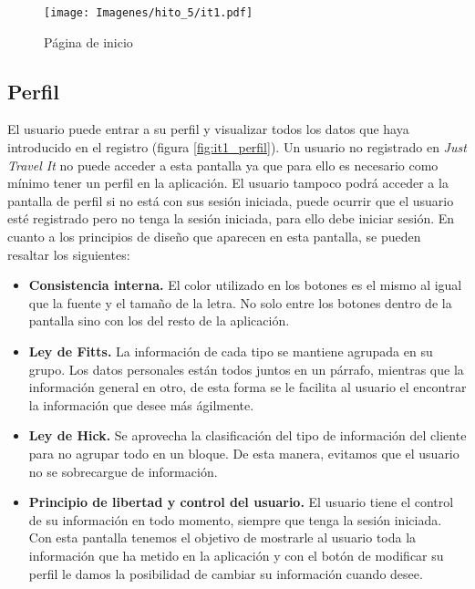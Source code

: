\begin{figure}[H]
    \centering
    \texttt{[image: Imagenes/hito\_5/it1.pdf]}
    \caption{Página de inicio}
    \label{fig:it1_registro}
\end{figure}

\subsection*{Perfil}

El usuario puede entrar a su perfil y visualizar todos los datos que haya introducido en el
registro (figura \ref{fig:it1_perfil}). Un usuario no registrado en \textit{Just Travel It} no puede acceder a esta pantalla ya que
para ello es necesario como mínimo tener un perfil en la aplicación. El usuario tampoco podrá
acceder a la pantalla de perfil si no está con sus sesión iniciada, puede ocurrir que el usuario
esté registrado pero no tenga la sesión iniciada, para ello debe iniciar sesión. En cuanto a los
principios de diseño que aparecen en esta pantalla, se pueden resaltar los siguientes:

\begin{itemize}
    \item \textbf{Consistencia interna.} El color utilizado en los botones es el mismo al igual
        que la fuente y el tamaño de la letra. No solo entre los botones dentro de la pantalla
        sino con los del resto de la aplicación.
    \item \textbf{Ley de Fitts.} La información de cada tipo se mantiene agrupada en su grupo. Los
        datos personales están todos juntos en un párrafo, mientras que la información general
        en otro, de esta forma se le facilita al usuario el encontrar la información que desee
        más ágilmente.
    \item \textbf{Ley de Hick.} Se aprovecha la clasificación del tipo de información del cliente para no
        agrupar todo en un bloque. De esta manera, evitamos que el usuario no se sobrecargue de
        información.
    \item \textbf{Principio de libertad y control del usuario.} El usuario tiene el control de su
        información en todo momento, siempre que tenga la sesión iniciada. Con esta pantalla
        tenemos el objetivo de mostrarle al usuario toda la información que ha metido en la
        aplicación y con el botón de modificar su perfil le damos la posibilidad de cambiar su
        información cuando desee.
\end{itemize}

